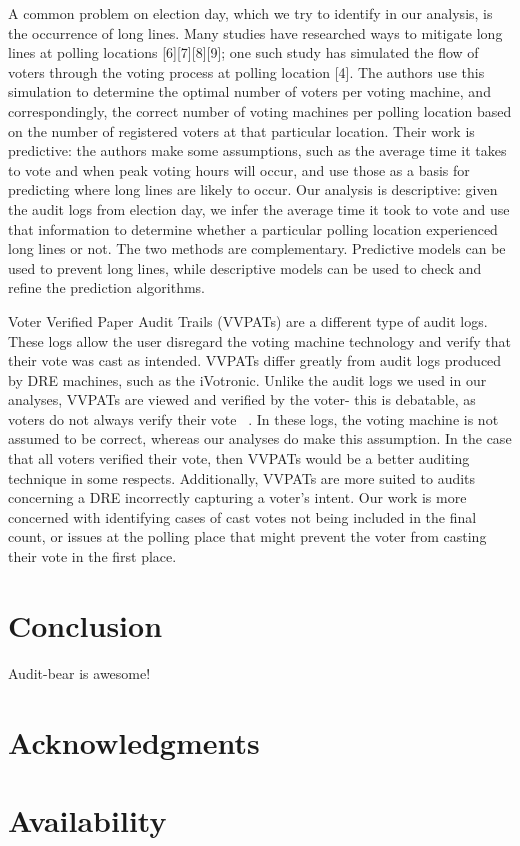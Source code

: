 \documentclass[letterpaper,twocolumn,10pt]{article}
\begin{document}
A common problem on election day, which we try to identify in our analysis, is the occurrence of long lines. Many studies have researched ways to mitigate long lines at polling locations [6][7][8][9]; one such study has simulated the flow of voters through the voting process at polling location [4]. The authors use this simulation to determine the optimal number of voters per voting machine, and correspondingly, the correct number of voting machines per polling location based on the number of registered voters at that particular location. Their work is predictive: the authors make some assumptions, such as the average time it takes to vote and when peak voting hours will occur, and use those as a basis for predicting where long lines are likely to occur. Our analysis is descriptive: given the audit logs from election day, we infer the average time it took to vote and use that information to determine whether a particular polling location experienced long lines or not. The two methods are complementary. Predictive models can be used to prevent long lines, while descriptive models can be used to check and refine the prediction algorithms.

Voter Verified Paper Audit Trails (VVPATs) are a different type of audit logs.  These logs allow the user disregard the voting machine technology and verify that their vote was cast as intended.  VVPATs differ greatly from audit logs produced by DRE machines, such as the iVotronic.  Unlike the audit logs we used in our analyses, VVPATs are viewed and verified by the voter- this is debatable, as voters do not always verify their vote ~\cite{Hall2006}.  In these logs, the voting machine is not assumed to be correct, whereas our analyses do make this assumption.  In the case that all voters verified their vote, then VVPATs would be a better auditing technique in some respects.  Additionally, VVPATs are more suited to audits concerning a DRE incorrectly capturing a voter’s intent.  Our work is more concerned with identifying cases of cast votes not being included in the final count, or issues at the polling place that might prevent the voter from casting their vote in the first place.

\section{Conclusion}
Audit-bear is awesome!

\section{Acknowledgments}
\section{Availability}




\end{document}
